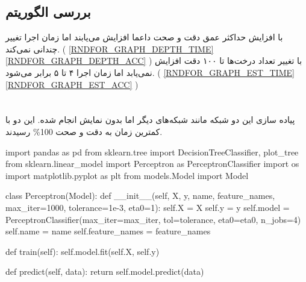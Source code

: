 \subsection{بررسی الگوریتم}
با افزایش حداکثر عمق دقت و صحت داعما افزایش می‌یابند اما زمان اجرا تغییر چندانی نمی‌کند.
(
\cref{RNDFOR_GRAPH_DEPTH_TIME}
\cref{RNDFOR_GRAPH_DEPTH_ACC}
)
با تغییر تعداد درخت‌ها تا ۱۰۰ دقت افزایش نمی‌یابد اما زمان اجرا ۴ تا ۵ برابر می‌شود.
(
\cref{RNDFOR_GRAPH_EST_TIME}
\cref{RNDFOR_GRAPH_EST_ACC}
)


\section{}

پیاده سازی این دو شبکه مانند شبکه‌های دیگر اما بدون نمایش انجام شده. این دو با کمترین زمان به دقت و صحت
100\%
رسیدند.

\begin{latin}
  \begin{python}
import pandas as pd
from sklearn.tree import DecisionTreeClassifier, plot_tree
from sklearn.linear_model import Perceptron as PerceptronClassifier
import os
import matplotlib.pyplot as plt
from models.Model import Model


class Perceptron(Model):
    def __init__(self, X, y, name, feature_names, max_iter=1000, tolerance=1e-3,
            eta0=1):
        self.X = X
        self.y = y
        self.model = PerceptronClassifier(max_iter=max_iter, tol=tolerance,
                eta0=eta0, n_jobs=4)
        self.name = name
        self.feature_names = feature_names

    def train(self):
        self.model.fit(self.X, self.y)

    def predict(self, data):
        return self.model.predict(data)
  \end{python}
\end{latin}


